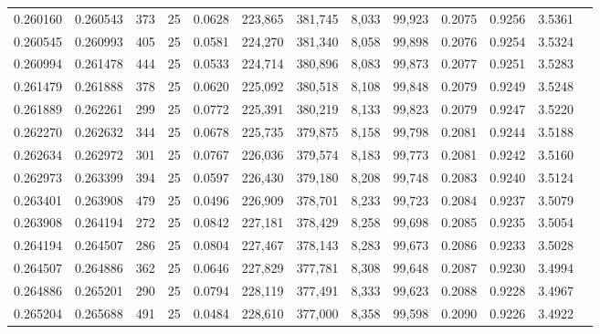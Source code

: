 \begin{tabular}{rrrrrrrrrrrrr}
0.260160 & 0.260543 &   373 &  25 &                                     0.0628 & 223,865 & 381,745 &   8,033 &  99,923 & 0.2075 & 0.9256 & 3.5361 \\
0.260545 & 0.260993 &   405 &  25 &                                     0.0581 & 224,270 & 381,340 &   8,058 &  99,898 & 0.2076 & 0.9254 & 3.5324 \\
0.260994 & 0.261478 &   444 &  25 &                                     0.0533 & 224,714 & 380,896 &   8,083 &  99,873 & 0.2077 & 0.9251 & 3.5283 \\
0.261479 & 0.261888 &   378 &  25 &                                     0.0620 & 225,092 & 380,518 &   8,108 &  99,848 & 0.2079 & 0.9249 & 3.5248 \\
0.261889 & 0.262261 &   299 &  25 &                                     0.0772 & 225,391 & 380,219 &   8,133 &  99,823 & 0.2079 & 0.9247 & 3.5220 \\
0.262270 & 0.262632 &   344 &  25 &                                     0.0678 & 225,735 & 379,875 &   8,158 &  99,798 & 0.2081 & 0.9244 & 3.5188 \\
0.262634 & 0.262972 &   301 &  25 &                                     0.0767 & 226,036 & 379,574 &   8,183 &  99,773 & 0.2081 & 0.9242 & 3.5160 \\
0.262973 & 0.263399 &   394 &  25 &                                     0.0597 & 226,430 & 379,180 &   8,208 &  99,748 & 0.2083 & 0.9240 & 3.5124 \\
0.263401 & 0.263908 &   479 &  25 &                                     0.0496 & 226,909 & 378,701 &   8,233 &  99,723 & 0.2084 & 0.9237 & 3.5079 \\
0.263908 & 0.264194 &   272 &  25 &                                     0.0842 & 227,181 & 378,429 &   8,258 &  99,698 & 0.2085 & 0.9235 & 3.5054 \\
0.264194 & 0.264507 &   286 &  25 &                                     0.0804 & 227,467 & 378,143 &   8,283 &  99,673 & 0.2086 & 0.9233 & 3.5028 \\
0.264507 & 0.264886 &   362 &  25 &                                     0.0646 & 227,829 & 377,781 &   8,308 &  99,648 & 0.2087 & 0.9230 & 3.4994 \\
0.264886 & 0.265201 &   290 &  25 &                                     0.0794 & 228,119 & 377,491 &   8,333 &  99,623 & 0.2088 & 0.9228 & 3.4967 \\
0.265204 & 0.265688 &   491 &  25 &                                     0.0484 & 228,610 & 377,000 &   8,358 &  99,598 & 0.2090 & 0.9226 & 3.4922 \\

\end{tabular}
